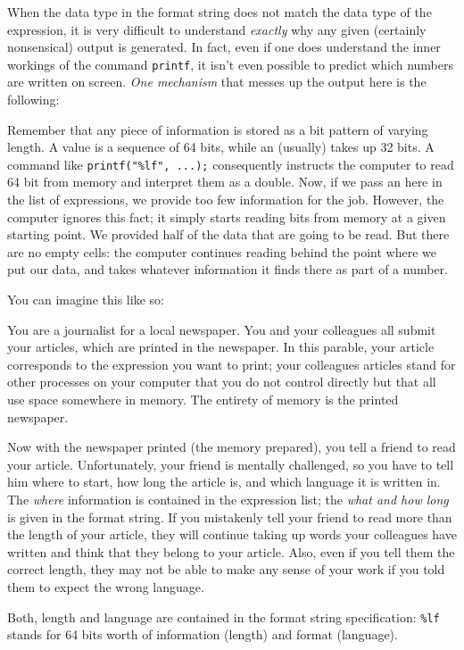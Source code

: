 \begin{plusbox}
When the data type in the format string does not match the data type of the expression, it is very difficult to understand \emph{exactly} why any given (certainly nonsensical) output is generated. In fact, even if one does understand the inner workings of the command \texttt{printf}, it isn't even possible to predict which numbers are written on screen. \emph{One mechanism} that messes up the output here is the following:

Remember that any piece of information is stored as a bit pattern of varying length. A  value is a sequence of 64 bits, while an  (usually) takes up 32 bits. A command like \texttt{printf("\%lf", ...);} consequently instructs the computer to read 64 bit from memory and interpret them as a double. Now, if we pass an  here in the list of expressions, we provide too few information for the job. However, the computer ignores this fact; it simply starts reading bits from memory at a given starting point. We provided half of the data that are going to be read. But there are no empty cells: the computer continues reading behind the point where we put our data, and takes whatever information it finds there as part of a  
number.

You can imagine this like so:

You are a journalist for a local newspaper. You and your colleagues all submit your articles, which are printed in the newspaper. In this parable, your article corresponds to the expression you want to print; your colleagues articles stand for other processes on your computer that you do not control directly but that all use space somewhere in memory. The entirety of memory is the printed newspaper.

Now with the newspaper printed (the memory prepared), you tell a friend to read your article. Unfortunately, your friend is mentally challenged, so you have to tell him where to start, how long the article is, and which language it is written in. The \emph{where} information is contained in the expression list; the \emph{what and how long} is given in the format string. If you mistakenly tell your friend to read more than the length of your article, they will continue taking up words your colleagues have written and think that they belong to your article. Also, even if you tell them the correct length, they may not be able to make any sense of your work if you told them to expect the wrong language.

Both, length and language are contained in the format string specification: \texttt{\%lf} stands for 64 bits worth of information (length) and  format (language).
\end{plusbox}


